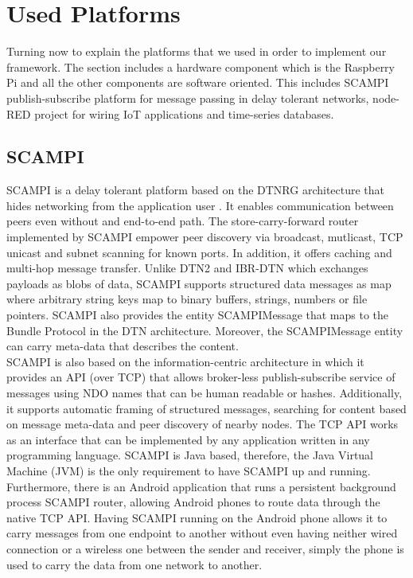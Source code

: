 \section{Used Platforms}
Turning now to explain the platforms that we used in order to implement our framework. The section includes a hardware component which is the Raspberry Pi and all the other components are software oriented. This includes SCAMPI publish-subscribe platform for message passing in delay tolerant networks, node-RED project for wiring IoT applications and time-series databases.

\subsection{SCAMPI}\label{sec:secampi}
SCAMPI is a delay tolerant platform based on the DTNRG architecture that hides networking from the application user \cite{Karkkainen:2012:SAP:2348616.2348636}. It enables communication between peers even without and end-to-end path. The store-carry-forward router implemented by SCAMPI empower peer discovery via broadcast, mutlicast, TCP unicast  and subnet scanning for known ports. In addition, it offers caching and multi-hop message transfer. Unlike DTN2 and IBR-DTN which exchanges payloads as blobs of data, SCAMPI supports structured data messages as map where arbitrary string keys map to binary buffers, strings, numbers or file pointers. SCAMPI also provides the entity SCAMPIMessage that maps to the Bundle Protocol in the DTN architecture. Moreover, the SCAMPIMessage entity can carry meta-data that describes the content. \\

\noindent SCAMPI is also based on the information-centric architecture in which it provides an API (over TCP) that allows broker-less publish-subscribe service of messages using NDO names that can be human readable or hashes. Additionally, it supports automatic framing of structured messages, searching for content based on message meta-data and peer discovery of nearby nodes. The TCP API works as an interface that can be implemented by any application written in any programming language. SCAMPI is Java based, therefore, the Java Virtual Machine (JVM) is the only requirement to have SCAMPI up and running. Furthermore, there is an Android application that runs  a persistent background process SCAMPI router, allowing Android phones to route data through the native TCP API. Having SCAMPI running on the Android phone allows it to carry messages from one endpoint to another without even having neither wired connection or a wireless one between the sender and receiver, simply the phone is used to carry the data from one network to another. \\

